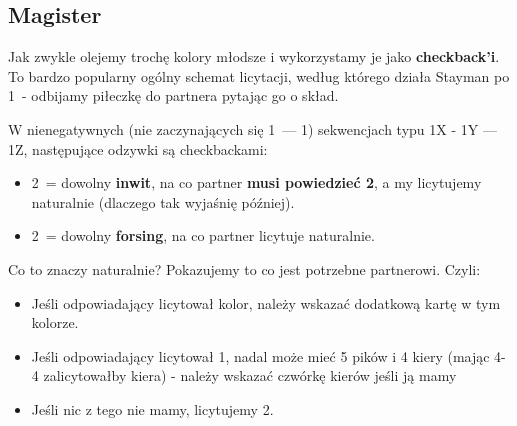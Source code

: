 \documentclass[12pt, a4paper]{article}
\begin{document}
    \subsection{Magister}
    Jak zwykle olejemy trochę kolory młodsze i wykorzystamy je jako 
    \textbf{checkback'i}. To bardzo popularny ogólny schemat licytacji,
    według którego działa Stayman po 1\nt\ - odbijamy piłeczkę do partnera
    pytając go o skład.

    \begin{formal}
        W nienegatywnych (nie zaczynających się 1\clubs\ --- 1\diams) sekwencjach
        typu 1X - 1Y --- 1Z, następujące odzywki są checkbackami:
        \begin{itemize}
            \item 2\clubs\ = dowolny \textbf{inwit}, na co partner \textbf{musi powiedzieć 2\diams},
            a my licytujemy naturalnie 
            (dlaczego tak wyjaśnię później).
            \item 2\diams\ = dowolny \textbf{forsing}, na co partner licytuje naturalnie.
        \end{itemize}
    \end{formal}

    Co to znaczy naturalnie? Pokazujemy to co jest potrzebne partnerowi.
    Czyli:
    \begin{itemize}
        \item Jeśli odpowiadający licytował kolor, należy wskazać dodatkową
        kartę w tym kolorze.
        \item Jeśli odpowiadający licytował 1\spades, nadal może mieć 
        5 pików i 4 kiery (mając 4-4 zalicytowałby kiera)
        - należy wskazać czwórkę kierów jeśli ją mamy
        \item Jeśli nic z tego nie mamy, licytujemy 2\nt.
    \end{itemize}
\end{document}
